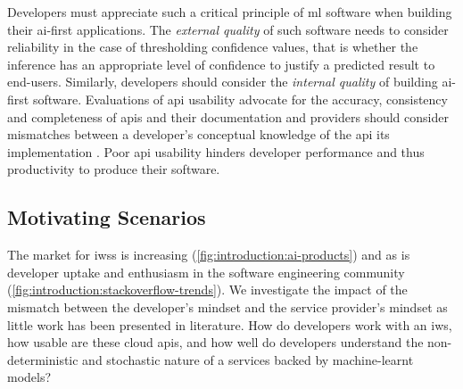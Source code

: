 Developers must appreciate such a critical principle of \gls{ml} software when building their \gls{ai}-first applications. The \textit{external quality} of such software needs to consider reliability in the case of thresholding confidence values, that is whether the inference has an appropriate level of confidence to justify a predicted result to end-users. Similarly, developers should consider the \textit{internal quality} of building \gls{ai}-first software. Evaluations of \gls{api} usability advocate for the accuracy, consistency and completeness of \glspl{api} and their documentation \citep{Piccioni:2013em,Robillard:2009uk} and providers should consider mismatches between a developer's conceptual knowledge of the \gls{api} its implementation \citep{Ko:2011fb}. Poor \gls{api} usability hinders developer performance and thus productivity to produce their software.
%
%
%

\subsection{Motivating Scenarios}
\label{ssec:introduction:motivation:scenario}

The market for \glspl{iws} is increasing (\cref{fig:introduction:ai-products}) and as is developer uptake and enthusiasm in the software engineering community (\cref{fig:introduction:stackoverflow-trends}). We investigate the impact of the mismatch between the developer's mindset and the service provider's mindset as little work has been presented in literature. How do developers work with an \gls{iws}, how usable are these cloud \glspl{api}, and how well do developers understand the non-deterministic and stochastic nature of a services backed by machine-learnt models? 

